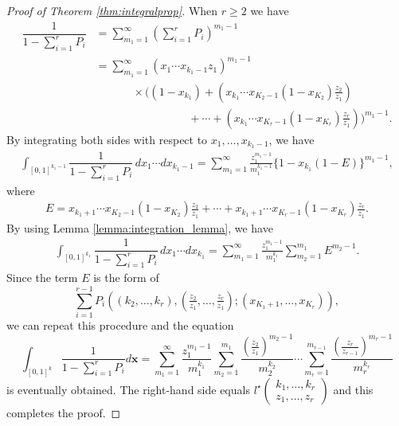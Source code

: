 \documentclass[12pt,a4paper]{article}
\theoremstyle{remark}
\begin{document}
\begin{proof}[Proof of Theorem \ref{thm:integralprop}]
When $r\ge 2$ we have
\begin{align*}
\dfrac{1}{1- \sum_{i=1}^r P_i}
&=
\sum_{m_1=1}^{\infty} 
\left(\sum_{i=1}^rP_i\right)^{m_1-1}\\
&=
\sum_{m_1=1}^{\infty} 
(x_1\cdots x_{k_1-1}z_1)^{m_1-1} \\
&\hspace{40pt}\times \Bigg( 
(1-x_{k_1}) + \left(x_{k_1}\cdots x_{K_2-1}(1-x_{K_2}) \tfrac{z_2}{z_1}\right)\\
&\hspace{100pt} +\cdots +\left(x_{k_1}\cdots x_{K_r-1}(1-x_{K_r}) \tfrac{z_r}{z_1}\right)
\Bigg)^{m_1-1}.
\end{align*}
By integrating both sides with respect to
$x_1, \ldots ,x_{k_1-1}$, we have
\begin{align*}
\int_{[0,1]^{k_1-1}} \dfrac{1}{1- \sum_{i=1}^r P_i}\,dx_1 \cdots dx_{k_1-1}
=
\sum_{m_1=1}^{\infty} 
\frac{z_1^{m_1-1}}{m_1^{k_1-1}} \Big\{ 1-x_{k_1} (1- E) \Big\}^{m_1-1},
\end{align*}
where 
\begin{align*}
E= x_{k_1+1}\cdots x_{K_2-1}(1-x_{K_2}) \tfrac{z_2}{z_1}
+\cdots 
+x_{k_1+1}\cdots x_{K_r-1}(1-x_{K_r}) \tfrac{z_r}{z_1}.
\end{align*}
By using Lemma \ref{lemma:integration_lemma},
we have
\begin{align*}
\int_{[0,1]^{k_1}} \dfrac{1}{1- \sum_{i=1}^r P_i}\,dx_1 \cdots dx_{k_1}=
\sum_{m_1=1}^{\infty} 
\frac{z_1^{m_1-1}}{m_1^{k_1}}
\sum_{m_2=1}^{m_1} E^{m_2-1}.
\end{align*}
Since the term $E$ is the form of
\[  \sum_{i=1}^{r-1} P_i\left((k_2,\ldots ,k_r),
   \left( \tfrac{z_2}{z_1},\ldots ,\tfrac{z_r}{z_1}\right);
   (x_{K_1+1}, \ldots ,x_{K_r})
\right),\]  
we can repeat this procedure 
and the equation
\[
\displaystyle\int_{[0,1]^k}
\dfrac{1}{1- \sum_{i=1}^rP_i} d\boldsymbol{x}=
\sum_{m_1=1}^{\infty} 
\frac{z_1^{m_1-1}}{m_1^{k_1}}
\sum_{m_2=1}^{m_1}
\frac{(\frac{z_2}{z_1})^{m_2-1}}{m_2^{k_2}}
\cdots 
\sum_{m_r=1}^{m_{r-1}}
\frac{(\frac{z_r}{z_{r-1}})^{m_r-1}}{m_r^{k_r}}
\]
is eventually obtained.
The right-hand side equals $l^{\star}
\begin{pmatrix}
k_1, \ldots , k_r \\
z_1, \ldots , z_r
\end{pmatrix}$ and this completes the proof.
\end{proof}
\end{document}

